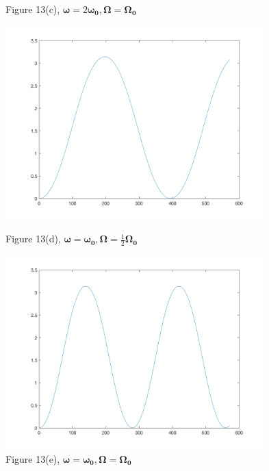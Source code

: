 \documentclass[12pt]{article}
\renewcommand{\(}{\left (}
\renewcommand{\)}{\right )}
\renewcommand{\vec}[1]{\boldsymbol{#1}}
\begin{document}
\begin{figure}[h]
\begin{minipage}{0.33\textwidth}
		\caption*{\small Figure 13(c), $\vec{\omega} = 2\vec{\omega_0}, \vec{\Omega} = \vec{\Omega_0}$}
	\end{minipage}
	\begin{minipage}{0.33\textwidth}
		\centering
		\includegraphics[width=0.89\textwidth]{E500.png}
		\caption*{\small Figure 13(d), $\vec{\omega} = \vec{\omega_0}, \vec{\Omega} = \frac{1}{2}\vec{\Omega_0}$}
	\end{minipage}
	\begin{minipage}{0.33\textwidth}
		\centering
		\includegraphics[width=0.89\textwidth]{E1000.png}
		\caption*{\small Figure 13(e), $\vec{\omega} = \vec{\omega_0}, \vec{\Omega} = \vec{\Omega_0}$}
	\end{minipage}
	\begin{minipage}{0.33\textwidth}
		\centering

\end{minipage}
\end{figure}
\end{document}
